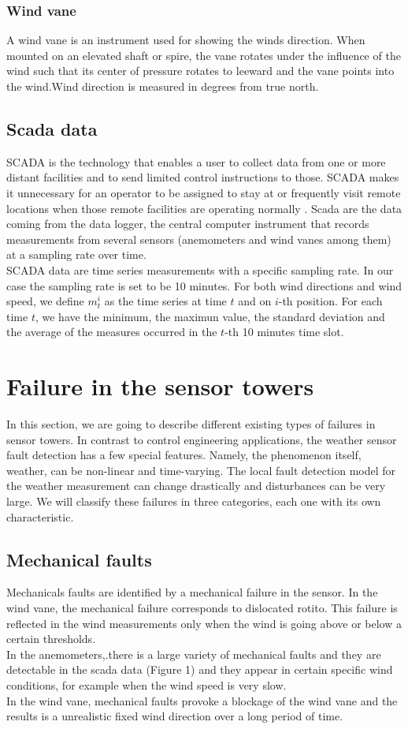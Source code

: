 \documentclass[journal]{IEEEtran}
\begin{document}
\subsubsection{Wind vane}
A wind vane is an instrument used for showing the winds direction. When mounted on an elevated shaft or spire, the vane rotates under the influence of the wind such that its center of pressure rotates to leeward and the vane points into the wind.Wind direction is measured in degrees from true north.\cite{sayigh2012comprehensive}

\subsection{Scada data}\label{subsec:scadaData}
SCADA is the technology that enables a user to collect data from one or more distant facilities and to send limited control instructions to those. SCADA makes it unnecessary for an operator to be assigned to stay at or frequently visit remote locations when those remote facilities are operating normally \cite{}.
Scada are the data coming from the data logger, the central computer instrument that records measurements from several sensors (anemometers and wind vanes among them) at a sampling rate over time.\\
SCADA data are time series measurements with a specific sampling rate. In our case the sampling rate is set to be 10 minutes.
For both wind directions and wind speed, we define $m_t^i$ as the time series at time $t$ and on $i$-th position. For each time $t$, we have the minimum, the maximun value, the standard deviation and the average of the measures occurred in the $t$-th 10 minutes time slot.


\section{Failure in the sensor towers}\label{sec:failures}
In this section, we are going to describe different existing types of failures in sensor towers. In contrast to control engineering applications, the weather sensor fault detection has a few special features. Namely, the phenomenon itself, weather, can be non-linear and time-varying. The local fault detection model for the weather measurement can change drastically and disturbances can be very large. We will classify these failures in three categories, each one with its own characteristic.
\subsection{Mechanical faults} Mechanicals faults are identified by a mechanical failure in the sensor. In the wind vane, the mechanical failure corresponds to dislocated rotito. This failure is reflected in the wind measurements only when the wind is going above or below a certain thresholds.\\
In the anemometers,.there is a large variety of mechanical faults and they are detectable in the scada data (Figure 1) and they appear in certain specific wind conditions, for example when the wind speed is very slow. \\
In the wind vane, mechanical faults provoke a blockage of the wind vane and the results is a unrealistic fixed wind direction over a long period of time.
\end{document}
